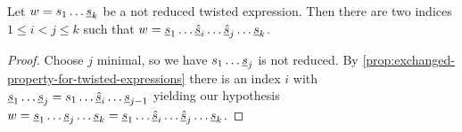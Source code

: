 \begin{prop}
	Let $w = s_1 \ldots \underline{s}_k$ be a not reduced twisted expression. Then there are two indices $1 \leq i < j \leq k$ such that $w = \underline{s}_1 \ldots \underline{\hat s}_i \ldots \underline{\hat s}_j \ldots \underline{s}_k$.

	\begin{proof}
		Choose $j$ minimal, so we have $s_1 \ldots \underline{s}_j$ is not reduced. By \ref{prop:exchanged-property-for-twisted-expressions} there is an index $i$ with $\underline{s}_1 \ldots \underline{s}_j = s_1 \ldots \underline{\hat s}_i \ldots \underline{s}_{j-1}$ yielding our hypothesis $w = \underline{s}_1 \ldots \underline{s}_j \ldots \underline{s}_k = \underline{s}_1 \ldots \underline{\hat s}_i \ldots \underline{\hat s}_j \ldots \underline{s}_k$.
	\end{proof}
\end{prop}